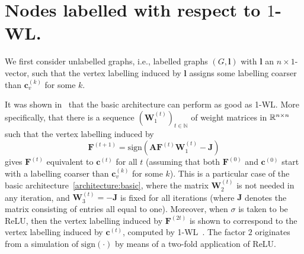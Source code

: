 \section{Nodes labelled with respect to $1$-WL.}
We first  consider unlabelled graphs, i.e., labelled graphs $(G,\mathbf{l})$ with $\mathbf{l}$ an $n\times 1$-vector, such that the
vertex labelling induced by $\mathbf{l}$ assigns some labelling coarser than $\mathbf{c}^{(k)}_v$ for some $k$.

It was shown in~\cite{grohewl} that the basic architecture can perform as good as 1-WL.
More specifically, that there is a sequence
$(\mathbf{W}_1^{(t)})_{t\in\mathbb{N}}$ of weight matrices in $\mathbb{R}^{n\times n}$ such that
the vertex labelling induced by
\begin{equation}\label{eqn:grohegnn}
  \mathbf{F}^{(t+1)} = \text{sign}\left(
    \mathbf{A}\mathbf{F}^{(t)}\mathbf{W}_1^{(t)} - \mathbf{J}  \right)
\end{equation}
gives $\mathbf{F}^{(t)}$ equivalent to $\mathbf{c}^{(t)}$ for all $t$ (assuming that both $\mathbf{F}^{(0)}$ and $\mathbf{c}^{(0)}$ start with a labelling coarser than $\mathbf{c}^{(k)}_v$ for some $k$).
This is a particular case of the basic architecture~\eqref{architecture:basic}, where the matrix $\mathbf{W}_2^{(t)}$ is not needed
in any iteration, and $\mathbf{W}_3^{(t)} = -\mathbf{J}$ is fixed for all iterations (where $\mathbf{J}$ denotes the matrix consisting of entries all equal to one).
Moreover, when $\sigma$ is taken to be ReLU, then the vertex labelling induced by  $\mathbf{F}^{(2t)}$ 
is shown to correspond to the vertex labelling induced by $\mathbf{c}^{(t)}$, computed by 1-WL~\cite{grohewl}. The factor $2$ originates
from a simulation of $\text{sign}(\cdot)$ by means of a two-fold application of ReLU.

